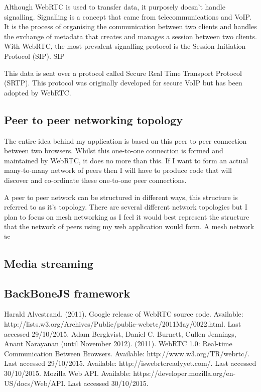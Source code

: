 \documentclass[]{report}
\begin{document}
			Although WebRTC is used to transfer data, it purposely doesn't handle signalling. Signalling is a concept that came from telecommunications and VoIP. It is the process of organising the communication between two clients and handles the exchange of metadata that creates and manages a session between two clients. With WebRTC, the most prevalent signalling protocol is the Session Initiation Protocol (SIP). SIP 
			
			This data is sent over a protocol called Secure Real Time Transport Protocol (SRTP). This protocol was originally developed for secure VoIP but has been adopted by WebRTC. 
	
		
		\subsection*{Peer to peer networking topology}
		The entire idea behind my application is based on this peer to peer connection between two browsers. Whilst this one-to-one connection is formed and maintained by WebRTC, it does no more than this. If I want to form an actual many-to-many network of peers then I will have to produce code that will discover and co-ordinate these one-to-one peer connections.
	
		A peer to peer network can be structured in different ways, this structure is referred to as it's topology. There are several different network topologies but I plan to focus on mesh networking as I feel it would best represent the structure that the network of peers using my web application would form. A mesh network is: 
		
		
		\subsection*{Media streaming}
		\subsection*{BackBoneJS framework}
		
	\begin{thebibliography}{9}
		Harald Alvestrand. (2011). Google release of WebRTC source code. Available: http://lists.w3.org/Archives/Public/public-webrtc/2011May/0022.html. Last accessed 29/10/2015.
		Adam Bergkvist, Daniel C. Burnett, Cullen Jennings, Anant Narayanan (until November 2012). (2011). WebRTC 1.0: Real-time Communication Between Browsers. Available: http://www.w3.org/TR/webrtc/. Last accessed 29/10/2015.
		Available: http://iswebrtcreadyyet.com/. Last accessed 30/10/2015.
		Mozilla Web API. Available: https://developer.mozilla.org/en-US/docs/Web/API. Last accessed 30/10/2015.
	\end{thebibliography}
\end{document}

